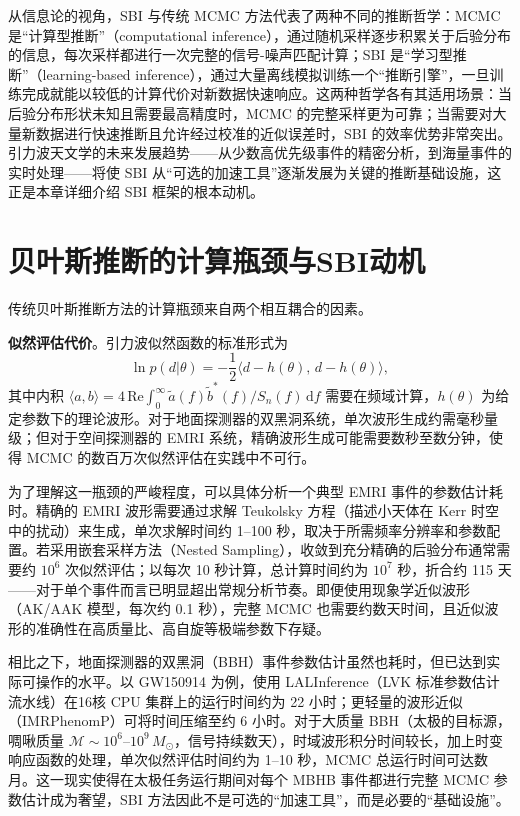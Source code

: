 从信息论的视角，SBI 与传统 MCMC 方法代表了两种不同的推断哲学：MCMC 是“计算型推断”（computational inference），通过随机采样逐步积累关于后验分布的信息，每次采样都进行一次完整的信号-噪声匹配计算；SBI 是“学习型推断”（learning-based inference），通过大量离线模拟训练一个“推断引擎”，一旦训练完成就能以较低的计算代价对新数据快速响应。这两种哲学各有其适用场景：当后验分布形状未知且需要最高精度时，MCMC 的完整采样更为可靠；当需要对大量新数据进行快速推断且允许经过校准的近似误差时，SBI 的效率优势非常突出。引力波天文学的未来发展趋势——从少数高优先级事件的精密分析，到海量事件的实时处理——将使 SBI 从“可选的加速工具”逐渐发展为关键的推断基础设施，这正是本章详细介绍 SBI 框架的根本动机。

\section{贝叶斯推断的计算瓶颈与SBI动机}

传统贝叶斯推断方法的计算瓶颈来自两个相互耦合的因素。

\textbf{似然评估代价}。引力波似然函数的标准形式为
\begin{equation}
  \ln p(d|\theta) = -\frac{1}{2}\langle d - h(\theta),\, d - h(\theta)\rangle,
\end{equation}
其中内积 $\langle a, b\rangle = 4\,\mathrm{Re}\int_0^\infty \tilde{a}(f)\tilde{b}^*(f)/S_n(f)\,\mathrm{d}f$ 需要在频域计算，$h(\theta)$ 为给定参数下的理论波形。对于地面探测器的双黑洞系统，单次波形生成约需毫秒量级；但对于空间探测器的 EMRI 系统，精确波形生成可能需要数秒至数分钟，使得 MCMC 的数百万次似然评估在实践中不可行。

为了理解这一瓶颈的严峻程度，可以具体分析一个典型 EMRI 事件的参数估计耗时。精确的 EMRI 波形需要通过求解 Teukolsky 方程（描述小天体在 Kerr 时空中的扰动）来生成，单次求解时间约 1--100 秒，取决于所需频率分辨率和参数配置。若采用嵌套采样方法（Nested Sampling），收敛到充分精确的后验分布通常需要约 $10^6$ 次似然评估；以每次 10 秒计算，总计算时间约为 $10^7$ 秒，折合约 115 天——对于单个事件而言已明显超出常规分析节奏。即便使用现象学近似波形（AK/AAK 模型，每次约 0.1 秒），完整 MCMC 也需要约数天时间，且近似波形的准确性在高质量比、高自旋等极端参数下存疑。

相比之下，地面探测器的双黑洞（BBH）事件参数估计虽然也耗时，但已达到实际可操作的水平。以 GW150914 为例，使用 LALInference（LVK 标准参数估计流水线）在16核 CPU 集群上的运行时间约为 22 小时；更轻量的波形近似（IMRPhenomP）可将时间压缩至约 6 小时。对于大质量 BBH（太极的目标源，啁啾质量 $\mathcal{M} \sim 10^6$--$10^9\,M_\odot$，信号持续数天），时域波形积分时间较长，加上时变响应函数的处理，单次似然评估时间约为 1--10 秒，MCMC 总运行时间可达数月。这一现实使得在太极任务运行期间对每个 MBHB 事件都进行完整 MCMC 参数估计成为奢望，SBI 方法因此不是可选的“加速工具”，而是必要的“基础设施”。

